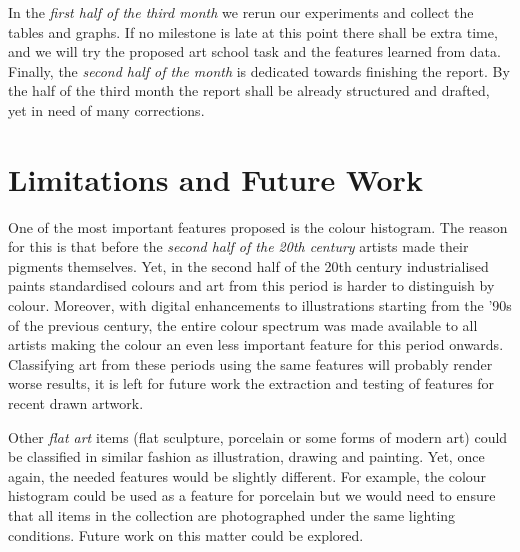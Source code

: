 \documentclass[a4paper,twocolumn]{article}
\begin{document}
In the \emph{first half of the third month} we rerun our experiments and
collect the tables and graphs.  If no milestone is late at this point there
shall be extra time, and we will try the proposed art school task and the
features learned from data.  Finally, the \emph{second half of the month} is
dedicated towards finishing the report.  By the half of the third month the
report shall be already structured and drafted, yet in need of many
corrections.

\section{Limitations and Future Work}

One of the most important features proposed is the colour histogram.  The
reason for this is that before the \emph{second half of the 20th century}
artists made their pigments themselves.  Yet, in the second half of the 20th
century industrialised paints standardised colours and art from this period is
harder to distinguish by colour.  Moreover, with digital enhancements to
illustrations starting from the '90s of the previous century, the entire colour
spectrum was made available to all artists making the colour an even less
important feature for this period onwards.  Classifying art from these periods
using the same features will probably render worse results, it is left for
future work the extraction and testing of features for recent drawn artwork.

Other \emph{flat art} items (flat sculpture, porcelain or some forms of modern
art) could be classified in similar fashion as illustration, drawing and
painting.  Yet, once again, the needed features would be slightly different.
For example, the colour histogram could be used as a feature for porcelain but
we would need to ensure that all items in the collection are photographed under
the same lighting conditions.  Future work on this matter could be explored.



\end{document}
